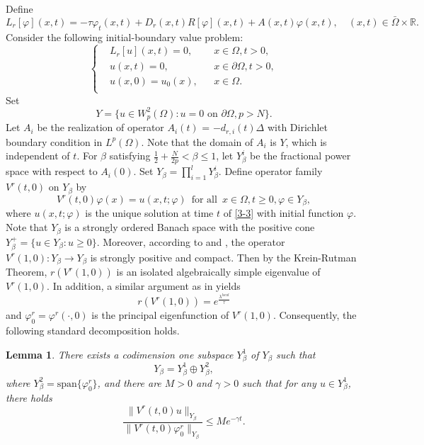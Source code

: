 \documentclass[11pt,reqno]{amsart}
\newtheorem{lemma}[theorem]{Lemma}
\numberwithin{equation}{section}
\begin{document}
Define
\begin{equation*}
L_{r}[\varphi](x,t)=-\tau\varphi_{t}(x,t) + D_{r}(x,t)R[\varphi](x,t)+A(x,t)\varphi(x,t), \quad (x,t)\in\bar\Omega\times\mathbb{R}.
\end{equation*}
Consider the following initial-boundary value problem:
%
\begin{equation}\label{3-3}
\left\{
\begin{aligned}
&L_{r}[u](x,t)=0, && x\in\Omega, t> 0,\\
&u(x,t)=0,  && x\in\partial\Omega, t>0,\\
&u(x,0)=u_{0}(x),  && x\in\Omega.\\
\end{aligned}
\right.
\end{equation}
%
Set
\begin{equation*}
Y = \{u\in W^{2}_{p}(\Omega): u=0 \text{ on } \partial{\Omega}, p>N \}.
\end{equation*}
Let $A_{i}$ be the realization of operator $A_{i}(t)$ = $-d_{r,i}(t) \Delta  $ with Dirichlet boundary condition in $L^{p}(\Omega)$.
Note that the domain of $A_{i}$ is $Y$, which is independent of $t$.
For $\beta$ satisfying $\frac{1}{2} + \frac{N}{2p} < \beta \leq 1$, let $Y^{i}_{\beta}$ be the fractional power space with respect to $A_{i}(0)$.
Set $Y_{\beta} = \prod_{i=1}^{l} Y^{i}_{\beta}$.
%
%
Define operator family $V^{r}(t,0)$ on $Y_{\beta}$ by
%
\begin{equation*}
V^{r}(t,0)\varphi(x)=u(x,t;\varphi)
\enspace \text{for all} \enspace x\in\Omega,t\geq 0, \varphi\in Y_{\beta},
\end{equation*}
where $u(x,t;\varphi)$ is the unique solution at time $t$ of \eqref{3-3} with initial function $\varphi$.
Note that $Y_{\beta}$ is a strongly ordered Banach space with the positive
cone $Y^{+}_{\beta} = \{ u\in Y_{\beta} : u\ge 0 \}$.
Moreover, according to \cite[Remark 12.1]{Peter} and \cite[Lemma 5.5]{baihe}, the operator
$V^{r}(1,0) : Y_{\beta} \to Y_{\beta}$ is strongly positive and compact.
Then by the Krein-Rutman Theorem, $r(V^{r}(1,0))$ is an isolated algebraically simple eigenvalue of $V^{r}(1,0)$.
In addition, a similar argument as in \cite[Proposition 14.4]{Peter} yields
\begin{equation*}
r(V^{r}(1,0)) = e^{ \frac{\lambda^{local}}{\tau}}
\end{equation*}
and $\varphi^{r}_{0}=\varphi^{r}(\cdot,0)$ is the principal eigenfunction of $V^{r}(1,0)$.
Consequently, the following standard decomposition holds.
\begin{lemma}\label{LEM3.2}
There exists a codimension one subspace $Y^{1}_{\beta}$ of $Y_{\beta}$ such that
$$
Y_{\beta} = Y^{1}_{\beta} \oplus Y^{2}_{\beta},
$$
where $Y^{2}_{\beta} = \text{span}\{\varphi^{r}_{0}\}$, and there are $M>0$ and $\gamma>0$ such that for any $u\in Y^{1}_{\beta}$, there holds
\begin{equation*}
\frac{\|V^{r}(t,0)u\|_{Y_{\beta}}}
{\|V^{r}(t,0)\varphi^{r}_{0}\|_{Y_{\beta}}}
\leq Me^{-\gamma t}.
\end{equation*}
\end{lemma}
\end{document}

